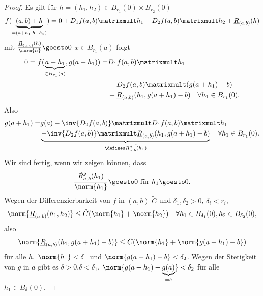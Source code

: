 \begin{proof}
  Es gilt für \( h=(h_1,h_2)\in B_{r_1}(0)\times B_{r_2}(0) \)
  \begin{equation*}
    f(\underbrace{(a,b)+h}_{=(a+h_1,b+h_2)})=0+D_1f(a,b)\matrixmult h_1+D_2 f(a,b)\matrixmult h_2+\underline{R}_{(a,b)}(h)
  \end{equation*}
  mit \( \frac{\underline{R}_{(a,b)}(h)}{\norm{h}}\goesto 0 \) \tforall \( x\in B_{r_1}(a) \) folgt
  \begin{equation*}
    \begin{split}
      0=f(\underbrace{a+h_1}_{\in B_{r_1}(a)},g(a+h_1))=&D_1 f(a,b)\matrixmult h_1\\
      &+D_2 f(a,b)\matrixmult (g(a+h_1)-b)\\
      &+\underline{R}_{(a,b)}(h_1,g(a+h_1)-b)\quad \forall h_1\in B_{r_1}(0).
    \end{split}
  \end{equation*}
  Also
  \begin{equation*}
    \begin{split}
      g(a+h_1)=&g(a)-\inv{D_2f(a,b)}\matrixmult D_1 f(a,b)\matrixmult h_1\\
      &\underbrace{-\inv{D_2f(a,b)}\matrixmult \underline{R}_{(a,b)}(h_1,g(a+h_1)-b)}_{\defines \tilde{R_{a,b}^g(h_1)}}\quad \forall h_1\in B_{r_1}(0).
    \end{split}
  \end{equation*}
  Wir sind fertig, wenn wir zeigen können, dass
  \begin{equation*}
    \frac{\tilde{R}_{a,b}^g(h_1)}{\norm{h_1}}\goesto 0 \text{ für }h_1\goesto 0.
  \end{equation*}
  Wegen der Differenzierbarkeit von \( f \) in \( (a,b) \) \texists  \( \tilde{C} \) und \( \delta_1,\delta_2>0 \), \( \delta_i<r_i \), \sd
  \begin{equation*}
    \norm{\underline{R}_{(a,b)}(h_1,h_2)}\leq \tilde{C}(\norm{h_1}+\norm{h_2})\quad \forall h_1\in B_{\delta_1}(0), h_2\in B_{\delta_2}(0),
  \end{equation*}
  also
  \begin{equation*}
    \norm{\underline{R}_{(a,b)}(h_1,g(a+h_1)-b)}\leq \tilde{C}(\norm{h_1}+\norm{g(a+h_1)-b})
  \end{equation*}
  für alle \( h_1 \) \sd \( \norm{h_1}<\delta_1 \) und \( \norm{g(a+h_1)-b}<\delta_2 \). Wegen der Stetigkeit von \( g \) in \( a \) gibt es \( \delta>0 \),\( \delta<\delta_1 \), \( \norm{g(a+h_1)-\underbrace{g(a)}_{=b}}<\delta_2 \) für alle \( h_1\in B_{\delta}(0) \).
\end{proof}
